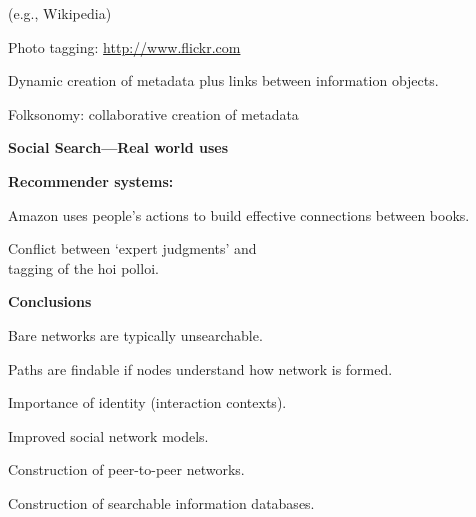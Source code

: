   (e.g., Wikipedia)
   
  Photo tagging:
  \url{http://www.flickr.com}
   
  Dynamic creation of metadata
  plus links between information objects.
   
  Folksonomy: collaborative creation of metadata
  
  

  \textbf{Social Search---Real world uses}

  \textbf{Recommender systems:}
    
    
      Amazon uses people's actions to build
      effective connections between books.  
    
      Conflict between `expert judgments' and\\
      tagging of the hoi polloi.
    
  





  \textbf{Conclusions}

  
  
    Bare networks are typically unsearchable.
   
    Paths are findable if nodes understand how network is formed.
   
    Importance of identity (interaction contexts).
   
    Improved social network models.
   
    Construction of peer-to-peer networks.
   
    Construction of searchable information databases.
  




